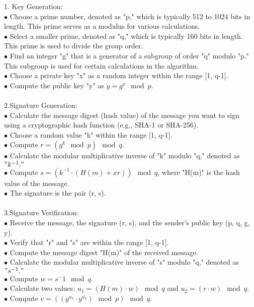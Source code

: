 \documentclass{report}
\begin{document}
1. Key Generation:\\
$\bullet$ Choose a prime number, denoted as "p," which is typically 512 to 1024 bits in length. This prime serves as a modulus for various calculations.\\
$\bullet$ Select a smaller prime, denoted as "q," which is typically 160 bits in length. This prime is used to divide the group order.\\
$\bullet$ Find an integer "g" that is a generator of a subgroup of order "q" modulo "p." This subgroup is used for certain calculations in the algorithm.\\
$\bullet$ Choose a private key "x" as a random integer within the range [1, q-1].\\
$\bullet$ Compute the public key "y" as \(y = g^x \mod p\).\\
\\
2.Signature Generation:\\
$\bullet$ Calculate the message digest (hash value) of the message you want to sign using a cryptographic hash function (e.g., SHA-1 or SHA-256).\\
$\bullet$ Choose a random value "k" within the range [1, q-1].\\
$\bullet$ Compute \(r = (g^k \mod p) \mod q\).\\
$\bullet$ Calculate the modular multiplicative inverse of "k" modulo "q," denoted as $"k^{-1}."$\\
$\bullet$ Compute \(s = (k^{-1} \cdot (H(m) + xr)) \mod q\), where "H(m)" is the hash value of the message.\\
$\bullet$ The signature is the pair (r, s).\\
\\
3.Signature Verification:\\
$\bullet$ Receive the message, the signature (r, s), and the sender's public key (p, q, g, y).\\
$\bullet$ Verify that "r" and "s" are within the range [1, q-1].\\
$\bullet$ Compute the message digest "H(m)" of the received message.\\
$\bullet$ Calculate the modular multiplicative inverse of "s" modulo "q," denoted as $"s^{-1}."$\\
$\bullet$ Compute \(w = s^-1 \mod q\).\\
$\bullet$ Calculate two values: \(u_1 = (H(m) \cdot w) \mod q\) and \(u_2 = (r \cdot w) \mod q\).\\
$\bullet$ Compute \(v = ((g^{u_1} \cdot y^{u_2}) \mod p) \mod q\).\\
\end{document}
